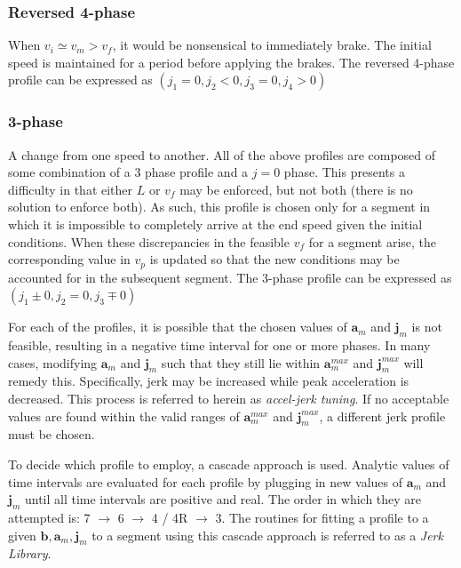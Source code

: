 \documentclass[letterpaper, 10 pt, conference]{ieeeconf}  %
\begin{document}
\subsubsection{Reversed 4-phase} \label{sec:reversed4phase}

When $v_i \simeq v_m > v_f$, it would be nonsensical to immediately brake.
The initial speed is maintained for a period before applying the brakes.
The reversed 4-phase profile can be expressed as $( j_1 = 0, j_2 < 0, j_3 = 0 , j_4 > 0 )$

\subsubsection{3-phase} \label{sec:3phase}

A change from one speed to another.
All of the above profiles are composed of some combination of a 3 phase profile and a $j = 0$ phase.
This presents a difficulty in that either $L$ or $v_f$ may be enforced, but not both (there is no solution to enforce both).
As such, this profile is chosen only for a segment in which it is impossible to completely arrive at the end speed given the initial conditions.
When these discrepancies in the feasible $v_f$ for a segment arise, the corresponding value in $v_p$ is updated so that the new conditions may be accounted for in the subsequent segment.
The 3-phase profile can be expressed as $(j_1 \pm 0 , j_2 = 0, j_3 \mp 0 )$

For each of the profiles, it is possible that the chosen values of $\mathbf{a}_m$ and $\mathbf{j}_m$ is not feasible, %
resulting in a negative time interval for one or more phases.
In many cases, modifying $\mathbf{a}_m$ and $\mathbf{j}_m$ such that they still lie within $\mathbf{a}^{max}_m$ and $\mathbf{j}^{max}_m$ will remedy this.
Specifically, jerk may be increased while peak acceleration is decreased.
This process is referred to herein as {\it accel-jerk tuning}.
If no acceptable values are found within the valid ranges of $\mathbf{a}^{max}_m$ and $\mathbf{j}^{max}_m$, a different jerk profile must be chosen.

To decide which profile to employ, a cascade approach is used.
Analytic values of time intervals are evaluated for each profile by plugging in new values of $\mathbf{a}_m$ and $\mathbf{j}_m$ until all time intervals are positive and real.
The order in which they are attempted is: 7 $\rightarrow$ 6 $\rightarrow$ 4 / 4R $\rightarrow$ 3.
The routines for fitting a profile to a given $\mathbf{b}, \mathbf{a}_m, \mathbf{j}_m$ to a segment using this cascade approach is referred to as a {\it Jerk Library}.
\end{document}
